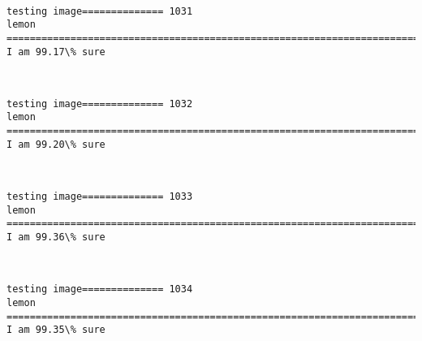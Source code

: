 \documentclass[11pt]{article}
\begin{document}
    \begin{center}
    \end{center}
    { \hspace*{\fill} \\}
    
    \begin{Verbatim}[commandchars=\\\{\}]
testing image============== 1031
lemon
============================================================================
I am 99.17\% sure

    \end{Verbatim}

    \begin{center}
    \end{center}
    { \hspace*{\fill} \\}
    
    \begin{Verbatim}[commandchars=\\\{\}]
testing image============== 1032
lemon
============================================================================
I am 99.20\% sure

    \end{Verbatim}

    \begin{center}
    \end{center}
    { \hspace*{\fill} \\}
    
    \begin{Verbatim}[commandchars=\\\{\}]
testing image============== 1033
lemon
============================================================================
I am 99.36\% sure

    \end{Verbatim}

    \begin{center}
    \end{center}
    { \hspace*{\fill} \\}
    
    \begin{Verbatim}[commandchars=\\\{\}]
testing image============== 1034
lemon
============================================================================
I am 99.35\% sure

    \end{Verbatim}
\end{document}
